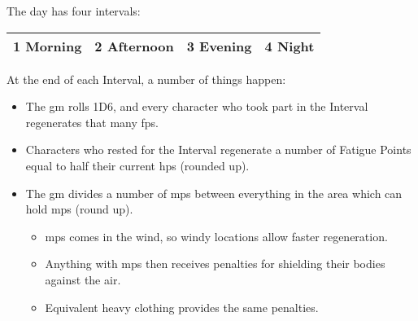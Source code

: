 The day has four intervals:

\vspace{1em}
\noindent
\begin{tabularx}{\linewidth}{c|c|c|c}

  \hline
  1 \textbf{Morning} & 2 \textbf{Afternoon} & 3 \textbf{Evening} & 4 \textbf{Night} \\
  \hline
\end{tabularx}
\vspace{1em}

At the end of each Interval, a number of things happen:

\begin{itemize}
  \item
  The \gls{gm} rolls 1D6, and every character who took part in the Interval regenerates that many \glspl{fp}.
  \item
  Characters who rested for the Interval regenerate a number of Fatigue Points equal to half their current \glspl{hp} (rounded up).
  \item
  The \gls{gm} divides a number of \glspl{mp} between everything in the area which can hold \glspl{mp} (round up).
  \begin{itemize}
    \item
    \Glspl{mp} comes in the wind, so windy locations allow faster regeneration.

    \manaRegenChart
    \item
    Anything with \glspl{mp} then receives penalties for shielding their bodies against the air.

    \manaCoveringChart
    \item
    Equivalent heavy clothing provides the same penalties.
  \end{itemize}
\end{itemize}
